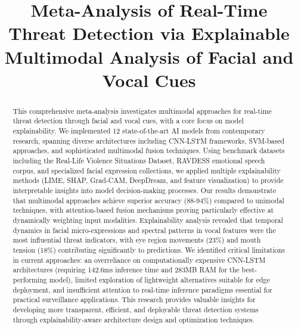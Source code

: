 \documentclass[conference,compsoc]{IEEEtran}
\begin{document}
\title{Meta-Analysis of Real-Time Threat Detection via Explainable Multimodal Analysis of Facial and Vocal Cues}

\author{
}

\maketitle

\begin{abstract}
This comprehensive meta-analysis investigates multimodal approaches for real-time threat detection through facial and vocal cues, with a core focus on model explainability. We implemented 12 state-of-the-art AI models from contemporary research, spanning diverse architectures including CNN-LSTM frameworks, SVM-based approaches, and sophisticated multimodal fusion techniques. Using benchmark datasets including the Real-Life Violence Situations Dataset, RAVDESS emotional speech corpus, and specialized facial expression collections, we applied multiple explainability methods (LIME, SHAP, Grad-CAM, DeepDream, and feature visualization) to provide interpretable insights into model decision-making processes. Our results demonstrate that multimodal approaches achieve superior accuracy (88-94\%) compared to unimodal techniques, with attention-based fusion mechanisms proving particularly effective at dynamically weighting input modalities. Explainability analysis revealed that temporal dynamics in facial micro-expressions and spectral patterns in vocal features were the most influential threat indicators, with eye region movements (23\%) and mouth tension (18\%) contributing significantly to predictions. We identified critical limitations in current approaches: an overreliance on computationally expensive CNN-LSTM architectures (requiring 142.6ms inference time and 283MB RAM for the best-performing model), limited exploration of lightweight alternatives suitable for edge deployment, and insufficient attention to real-time inference paradigms essential for practical surveillance applications. This research provides valuable insights for developing more transparent, efficient, and deployable threat detection systems through explainability-aware architecture design and optimization techniques.
\end{abstract}
\end{document}
